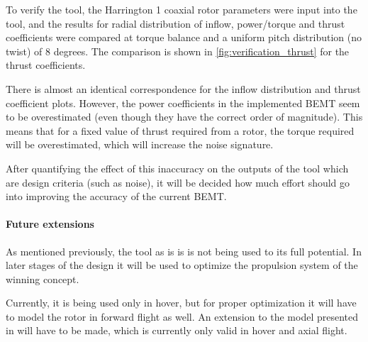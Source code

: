 To verify the tool, the Harrington 1 coaxial rotor parameters were input into the tool, and the results for radial distribution of inflow, power/torque and thrust coefficients were compared at torque balance and a uniform pitch distribution (no twist) of 8 degrees. The comparison is shown in  \autoref{fig:verification_thrust} for the thrust coefficients. 

There is almost an identical correspondence for the inflow distribution and thrust coefficient plots. However, the power coefficients in the implemented BEMT seem to be overestimated (even though they have the correct order of magnitude). This means that for a fixed value of thrust required from a rotor, the torque required will be overestimated, which will increase the noise signature.

After quantifying the effect of this inaccuracy on the outputs of the tool which are design criteria (such as noise), it will be decided how much effort should go into improving the accuracy of the current BEMT.






\paragraph{Future extensions}

As mentioned previously, the tool as is is is not being used to its full potential. In later stages of the design it will be used to optimize the propulsion system of the winning concept.

Currently, it is being used only in hover, but for proper optimization it will have to model the rotor in forward flight as well. An extension to the model presented in \cite{BEMT} will have to be made, which is currently only valid in hover and axial flight.

 
